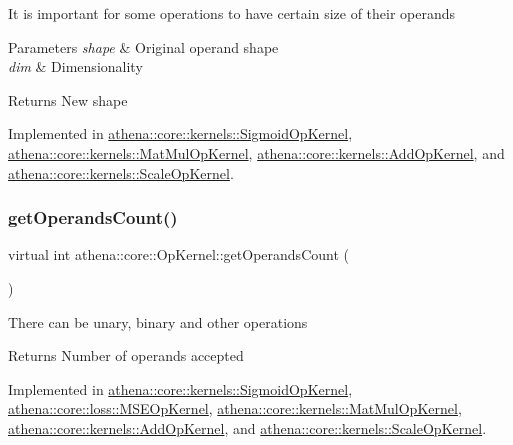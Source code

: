 It is important for some operations to have certain size of their operands 
\begin{DoxyParams}{Parameters}
{\em shape} & Original operand shape \\
\hline
{\em dim} & Dimensionality \\
\hline
\end{DoxyParams}
\begin{DoxyReturn}{Returns}
New shape 
\end{DoxyReturn}


Implemented in \mbox{\hyperlink{classathena_1_1core_1_1kernels_1_1_sigmoid_op_kernel_af2ba51d6085f6d5326c1ab1281717ea8}{athena\+::core\+::kernels\+::\+Sigmoid\+Op\+Kernel}}, \mbox{\hyperlink{classathena_1_1core_1_1kernels_1_1_mat_mul_op_kernel_aaf7aa2db812b58dedda8ed43d3ea994f}{athena\+::core\+::kernels\+::\+Mat\+Mul\+Op\+Kernel}}, \mbox{\hyperlink{classathena_1_1core_1_1kernels_1_1_add_op_kernel_a873ce3dc366c72f651331d91dd48be0a}{athena\+::core\+::kernels\+::\+Add\+Op\+Kernel}}, and \mbox{\hyperlink{classathena_1_1core_1_1kernels_1_1_scale_op_kernel_a7f9519bf17e1d70b56aa70cc49981470}{athena\+::core\+::kernels\+::\+Scale\+Op\+Kernel}}.

\mbox{\label{classathena_1_1core_1_1_op_kernel_add97d4c132d80ecd9915acfedf7c9119}} 
\subsubsection{\texorpdfstring{get\+Operands\+Count()}{getOperandsCount()}}
{\footnotesize\ttfamily virtual int athena\+::core\+::\+Op\+Kernel\+::get\+Operands\+Count (\begin{DoxyParamCaption}{ }\end{DoxyParamCaption})\hspace{0.3cm}{\ttfamily [pure virtual]}}

There can be unary, binary and other operations \begin{DoxyReturn}{Returns}
Number of operands accepted 
\end{DoxyReturn}


Implemented in \mbox{\hyperlink{classathena_1_1core_1_1kernels_1_1_sigmoid_op_kernel_acb639510462e759a92747cec8c32358b}{athena\+::core\+::kernels\+::\+Sigmoid\+Op\+Kernel}}, \mbox{\hyperlink{classathena_1_1core_1_1loss_1_1_m_s_e_op_kernel_ab851ee62ea95c3aab8aab2d28cfa9d04}{athena\+::core\+::loss\+::\+M\+S\+E\+Op\+Kernel}}, \mbox{\hyperlink{classathena_1_1core_1_1kernels_1_1_mat_mul_op_kernel_a75f9e43d1fcecaf9260af31c68cd69db}{athena\+::core\+::kernels\+::\+Mat\+Mul\+Op\+Kernel}}, \mbox{\hyperlink{classathena_1_1core_1_1kernels_1_1_add_op_kernel_a296a0c69a7b906037324cce2b64827e1}{athena\+::core\+::kernels\+::\+Add\+Op\+Kernel}}, and \mbox{\hyperlink{classathena_1_1core_1_1kernels_1_1_scale_op_kernel_a4f9e4fee100ed7f09840fa4b2d55f2bf}{athena\+::core\+::kernels\+::\+Scale\+Op\+Kernel}}.


